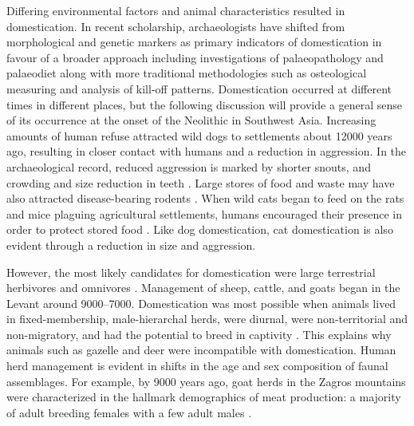 Differing environmental factors and animal characteristics resulted in domestication. 
In recent scholarship, archaeologists have shifted from morphological 
and genetic markers as primary indicators of domestication in favour of a broader approach including investigations of palaeopathology and palaeodiet
\parencites{Makarewicz_2012}{Pearson_2007} along with more traditional methodologies such as osteological measuring and analysis of kill-off patterns. 
Domestication occurred at different times in different places, but the following discussion will provide a general sense of its occurrence at the onset of the Neolithic in Southwest Asia. 
Increasing amounts of human refuse attracted wild dogs to settlements about \num{12000} years ago, resulting in closer contact with humans and a reduction in aggression. 
In the archaeological record, reduced aggression is marked by shorter snouts, 
and crowding and size reduction in teeth \parencite[341, 343--344]{Moray_1994}. 
Large stores of food and waste may have also attracted disease-bearing rodents \parencite[2087]{Linseele_2007}. 
When wild cats began to feed on the rats and mice plaguing agricultural settlements, 
humans encouraged their presence in order to protect stored food \parencite[2087]{Linseele_2007}.
Like dog domestication, cat domestication is also evident through a reduction in size and aggression. 

 However, the most likely candidates for domestication were large terrestrial herbivores and omnivores \parencite[702]{Diamond_2002}. 
Management of sheep, cattle, and goats began in the Levant around 9000--7000\BC. 
Domestication was most possible when animals lived in fixed-membership, 
male-hierarchal herds, were diurnal, were non-territorial and non-migratory, 
and had the potential to breed in captivity \parencites[702]{Diamond_2002}[856]{Rowley-Conwy_2011}. 
This explains why animals such as gazelle and deer were incompatible with domestication. 
Human herd management is evident in shifts in the age and sex composition of faunal assemblages. 
For example, by \num{9000} years ago, goat herds in the Zagros mountains were 
characterized in the hallmark demographics of meat production: 
a majority of adult breeding females with a few adult males \parencites[201]{Zeder_2006b}[187]{Zeder_2006c}.  

